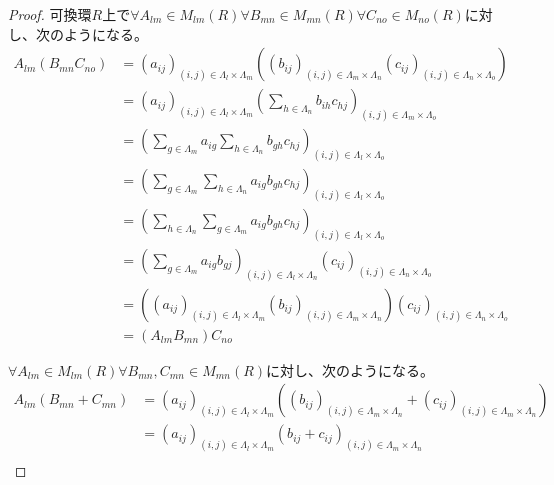 \documentclass[dvipdfmx]{jsarticle}
\begin{document}
\begin{proof}
可換環$R$上で$\forall A_{lm} \in M_{lm}(R)\forall B_{mn} \in M_{mn}(R)\forall C_{no} \in M_{no}(R)$に対し、次のようになる。
\begin{align*}
A_{lm}\left( B_{mn}C_{no} \right) &= \left( a_{ij} \right)_{(i,j) \in \varLambda_{l} \times \varLambda_{m}}\left( \left( b_{ij} \right)_{(i,j) \in \varLambda_{m} \times \varLambda_{n}}\left( c_{ij} \right)_{(i,j) \in \varLambda_{n} \times \varLambda_{o}} \right)\\
&= \left( a_{ij} \right)_{(i,j) \in \varLambda_{l} \times \varLambda_{m}}\left( \sum_{h \in \varLambda_{n}} {b_{ih}c_{hj}} \right)_{(i,j) \in \varLambda_{m} \times \varLambda_{o}}\\
&= \left( \sum_{g \in \varLambda_{m}} a_{ig}\sum_{h \in \varLambda_{n}} {b_{gh}c_{hj}} \right)_{(i,j) \in \varLambda_{l} \times \varLambda_{o}}\\
&= \left( \sum_{g \in \varLambda_{m}} {\sum_{h \in \varLambda_{n}} {a_{ig}b_{gh}c_{hj}}} \right)_{(i,j) \in \varLambda_{l} \times \varLambda_{o}}\\
&= \left( \sum_{h \in \varLambda_{n}} {\sum_{g \in \varLambda_{m}} {a_{ig}b_{gh}c_{hj}}} \right)_{(i,j) \in \varLambda_{l} \times \varLambda_{o}}\\
&= \left( \sum_{g \in \varLambda_{m}} {a_{ig}b_{gj}} \right)_{(i,j) \in \varLambda_{l} \times \varLambda_{n}}\left( c_{ij} \right)_{(i,j) \in \varLambda_{n} \times \varLambda_{o}}\\
&= \left( \left( a_{ij} \right)_{(i,j) \in \varLambda_{l} \times \varLambda_{m}}\left( b_{ij} \right)_{(i,j) \in \varLambda_{m} \times \varLambda_{n}} \right)\left( c_{ij} \right)_{(i,j) \in \varLambda_{n} \times \varLambda_{o}} \\
&= \left( A_{lm}B_{mn} \right)C_{no}
\end{align*}\par
$\forall A_{lm} \in M_{lm}(R)\forall B_{mn},C_{mn} \in M_{mn}(R)$に対し、次のようになる。
\begin{align*}
A_{lm}\left( B_{mn} + C_{mn} \right) &= \left( a_{ij} \right)_{(i,j) \in \varLambda_{l} \times \varLambda_{m}}\left( \left( b_{ij} \right)_{(i,j) \in \varLambda_{m} \times \varLambda_{n}} + \left( c_{ij} \right)_{(i,j) \in \varLambda_{m} \times \varLambda_{n}} \right)\\
&= \left( a_{ij} \right)_{(i,j) \in \varLambda_{l} \times \varLambda_{m}}\left( b_{ij} + c_{ij} \right)_{(i,j) \in \varLambda_{m} \times \varLambda_{n}}\\

\end{align*}
\end{proof}
\end{document}
